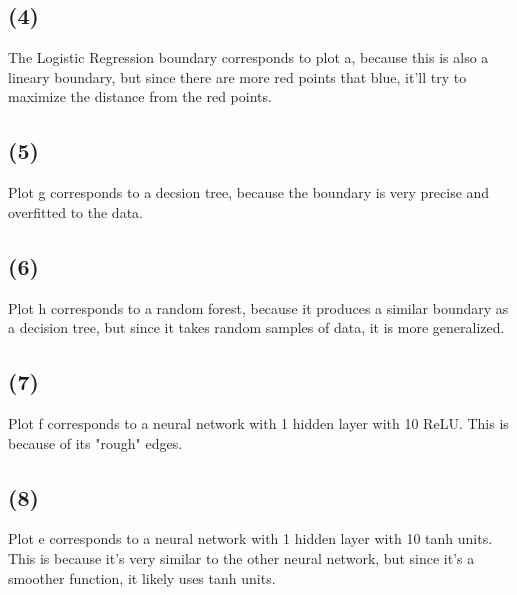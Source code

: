 \documentclass[12pt, letterpaper]{article}
\begin{document}
\subsection*{(4)} The Logistic Regression boundary corresponds to plot a, because this is also a lineary boundary, but since there are more red points that blue, it'll try to maximize the distance from the red points.

\subsection*{(5)} Plot g corresponds to a decsion tree, because the boundary is very precise and overfitted to the data.

\subsection*{(6)} Plot h corresponds to a random forest, because it produces a similar boundary as a decision tree, but since it takes random samples of data, it is more generalized.

\subsection*{(7)} Plot f corresponds to a neural network with 1 hidden layer with 10 ReLU. This is because of its "rough" edges.

\subsection*{(8)} Plot e corresponds to a neural network with 1 hidden layer with 10 tanh units. This is because it's very similar to the other neural network, but since it's a smoother function, it likely uses tanh units.
\end{document}

